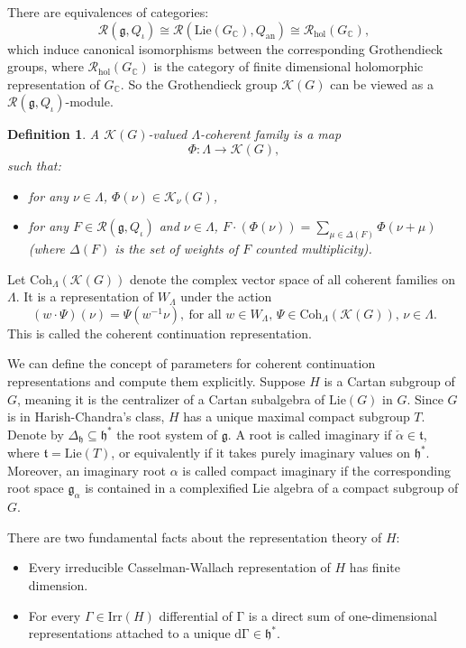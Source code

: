 \documentclass[12pt, a4paper]{amsart}
\numberwithin{equation}{section}
\newtheorem{defn}[thm]{Definition}
\newcommand{\BC}{{\mathbb {C}}}
\newcommand{\CK}{{\mathcal {K}}}
\newcommand{\CR}{{\mathcal {R}}}
\newcommand{\fg}{\mathfrak{g}}
\newcommand{\fh}{\mathfrak{h}}
\newcommand{\ft}{\mathfrak{t}}
\begin{document}
There are equivalences of categories:
\begin{equation}
   \CR(\fg, Q_{\iota}) \cong \CR(\mathrm{Lie}(G_\BC),Q_{\mathrm{an}}) \cong \CR_{\mathrm{hol}}(G_{\BC}),
\end{equation}
which induce canonical isomorphisms between the corresponding Grothendieck groups, where $\CR_{\mathrm{hol}}(G_{\BC})$ is the category of finite dimensional holomorphic representation of $G_{\BC}$. So the Grothendieck group $\CK(G)$ can be viewed as a $\CR(\fg, Q_{\iota})$-module.
\begin{defn}
   A $\CK(G)$-valued $\Lambda$-coherent family is a map
   $$\Phi: \Lambda \to \CK(G),$$
   such that:
   \begin{itemize}
      \item for any $\nu \in \Lambda$, $\Phi(\nu) \in \CK_{\nu}(G)$,
      \item for any $F \in \CR(\fg, Q_{\iota})$ and $\nu \in \Lambda$, $F \cdot (\Phi(\nu)) = \sum_{\mu \in \Delta(F)} \Phi(\nu + \mu)$ (where $\Delta(F)$ is the set of weights of $F$ counted multiplicity).
   \end{itemize}
\end{defn}

Let $\mathrm{Coh}_{\Lambda}(\CK(G))$ denote the complex vector space of all coherent families on $\Lambda$. It is a representation of $W_{\Lambda}$ under the action
$$(w \cdot \Psi)(\nu) = \Psi(w^{-1}\nu), \ \textrm{for all $w \in W_{\Lambda}$, $\Psi \in \mathrm{Coh}_{\Lambda}(\CK(G))$, $\nu \in \Lambda$.}$$
This is called the coherent continuation representation.

We can define the concept of parameters for coherent continuation representations and compute them explicitly.
Suppose $H$ is a Cartan subgroup of $G$, meaning it is the centralizer of a Cartan subalgebra of $\mathrm{Lie}(G)$ in $G$. Since $G$ is in Harish-Chandra's class, $H$ has a unique maximal compact subgroup $T$. Denote by $\Delta_{\fh} \subseteq \fh^*$ the root system of $\fg$. A root is called imaginary if $\check{\alpha} \in \ft$, where $\ft = \mathrm{Lie}(T)$, or equivalently if it takes purely imaginary values on $\fh^*$. Moreover, an imaginary root $\alpha$ is called compact imaginary if the corresponding root space $\fg_{\alpha}$ is contained in a complexified Lie algebra of a compact subgroup of $G$.

There are two fundamental facts about the representation theory of $H$:
\begin{itemize}
    \item Every irreducible Casselman-Wallach representation of $H$ has finite  dimension.
    \item For every $\Gamma \in \mathrm{Irr}(H)$ differential of $\mathrm{\Gamma}$ is a direct sum of one-dimensional representations attached to a unique $\mathrm{d\Gamma} \in \fh^*$.
\end{itemize}
\end{document}
